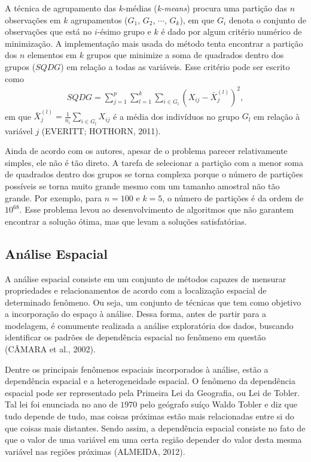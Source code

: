 \documentclass[12pt, a4paper,brazil,oneside]{article}
\begin{document}
	A técnica de agrupamento das $k$-médias (\textit{k-means}) procura uma partição das $n$ observações em $k$ agrupamentos ($G_1$, $G_2$, $\cdots$, $G_k$), em que $G_i$ denota o conjunto de observações que está no $i$-ésimo grupo e $k$ é dado por algum critério numérico de minimização. A implementação mais usada do método tenta encontrar a partição dos $n$ elementos em $k$ grupos que minimize a soma de quadrados dentro dos grupos ($SQDG$) em relação a todas as variáveis. Esse critério pode ser escrito como 
	\begin{align*}
	SQDG = \sum_{j=1}^{p}\sum_{l=1}^{k}\sum_{i \in G_l}(X_{ij} - \bar{X}_{j}^{(l)})^2,
	\end{align*}
	em que $\bar{X}_{j}^{(l)} = \displaystyle\frac{1}{n_i}\sum_{i \in G_l}X_{ij}$ é a média dos indivíduos no grupo $G_l$ em relação à variável $j$ (EVERITT; HOTHORN, 2011).
	
	Ainda de acordo com os autores, apesar de o problema parecer relativamente simples, ele não é tão direto. A tarefa de selecionar a partição com a menor soma de quadrados dentro dos grupos se torna complexa porque o número de partições possíveis se torna muito grande mesmo com um tamanho amostral não tão grande. Por exemplo, para $n = 100$ e $k=5$, o número de partições é da ordem de $10^{68}$. Esse problema levou ao desenvolvimento de algoritmos que não garantem encontrar a solução ótima, mas que levam a soluções satisfatórias.
	
	
	\subsection{Análise Espacial}
	
	A análise espacial consiste em um conjunto de métodos capazes de mensurar propriedades e relacionamentos de acordo com a localização espacial de determinado fenômeno. Ou seja, um conjunto de técnicas que tem como objetivo a incorporação do espaço à análise. Dessa forma, antes de partir para a modelagem, é comumente  realizada a análise exploratória dos dados, buscando identificar os padrões de dependência espacial no fenômeno em questão (CÂMARA et al., 2002).
	
	Dentre os principais fenômenos espaciais incorporados à análise, estão a dependência espacial e a heterogeneidade espacial. O fenômeno da dependência espacial pode ser representado pela Primeira Lei da Geografia, ou Lei de Tobler. Tal lei foi enunciada no ano de $1970$ pelo geógrafo suíço Waldo Tobler e diz que tudo depende de tudo, mas coisas próximas estão mais relacionadas entre si do que coisas mais distantes. Sendo assim, a dependência espacial consiste no fato de que o valor de uma variável em uma certa região depender do valor desta mesma variável nas regiões próximas (ALMEIDA, 2012).
	
\end{document}
